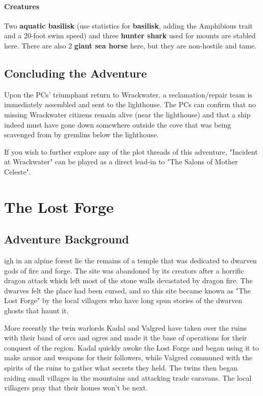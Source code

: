 \documentclass[10pt,a4paper,twoside,bg=print,twocolumn,openany,nodeprecatedcode]{dndbook}
\begin{document}
\subsubsection{Creatures}
Two \textbf{aquatic basilisk} (use statistics for \textbf{basilisk}, adding the Amphibious trait and a 20-foot swim speed) and three \textbf{hunter shark} used for mounts are stabled here. There are also 2 \textbf{giant sea horse} here, but they are non-hostile and tame.

\section{Concluding the Adventure}
Upon the PCs' triumphant return to Wrackwater, a reclamation/repair team is immediately assembled and sent to the lighthouse. The PCs can confirm that no missing Wrackwater citizens remain alive (near the lighthouse) and that a ship indeed must have gone down somewhere outside the cove that was being scavenged from by gremlins below the lighthouse.

If you wish to further explore any of the plot threads of this adventure, "Incident at Wrackwater" can be played as a direct lead-in to "The Salons of Mother Celeste".

\chapter{The Lost Forge}

\begin{DndTable}{c}

\textbf{An adventure for four to five characters of 5th level says 6th level.} characters}\\
\end{DndTable}

\section{Adventure Background}
igh in an alpine forest lie the remains of a temple that was dedicated to dwarven gods of fire and forge. The site was abandoned by its creators after a horrific dragon attack which left most of the stone walls devastated by dragon fire. The dwarves felt the place had been cursed, and so this site became known as "The Lost Forge" by the local villagers who have long spun stories of the dwarven ghosts that haunt it.


More recently the twin warlords Kadal and Valgred have taken over the ruins with their band of orcs and ogres and made it the base of operations for their conquest of the region. Kadal quickly awoke the Lost Forge and began using it to make armor and weapons for their followers, while Valgred communed with the spirits of the ruins to gather what secrets they held. The twins then began raiding small villages in the mountains and attacking trade caravans. The local villagers pray that their homes won't be next.
\end{document}
